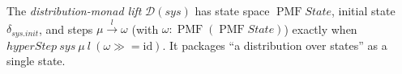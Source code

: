 \begin{definition}
  \label{def:dist}
  \leanok
  The \emph{distribution-monad lift} $\mathcal{D}(sys)$ has state space
  $\operatorname{PMF} State$, initial state $\delta_{sys.init}$, and steps
  $\mu \xrightarrow{l} \omega$ (with $\omega : \operatorname{PMF}(\operatorname{PMF} State)$)
  exactly when $hyperStep\ sys\ \mu\ l\ (\omega \mathbin{\gg\!=}\mathrm{id})$. It
  packages ``a distribution over states'' as a single state.
\end{definition}
